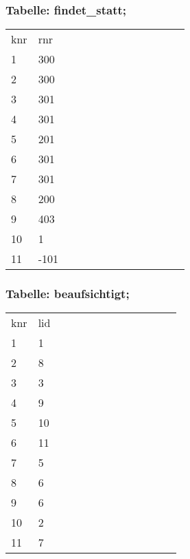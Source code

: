 \documentclass[fleqn]{scrartcl}
\begin{document}
\subsubsection{Tabelle: findet\_statt;}
\begin{tabular}{|l|l|l|l|l|l|l|l|l|l|l|l|l|}\toprule
\rowcolor{green!20}
\multicolumn{2}{|c|}{
findet\_statt;
}\\\midrule
\rowcolor{yellow!30}knr & rnr  \\\midrule
1& 300  \\ 
2& 300  \\ 
3& 301  \\ 
4& 301  \\ 
5& 201  \\ 
6& 301  \\ 
7& 301  \\ 
8& 200  \\ 
9& 403  \\ 
10& 1  \\ 
11& -101  \\ 
\bottomrule
\end{tabular}

\subsubsection{Tabelle: beaufsichtigt;}
\begin{tabular}{|l|l|l|l|l|l|l|l|l|l|l|l|l|}\toprule
\rowcolor{green!20}
\multicolumn{2}{|c|}{
beaufsichtigt;
}\\\midrule
\rowcolor{yellow!30}knr & lid  \\\midrule
1& 1  \\ 
2& 8  \\ 
3& 3  \\ 
4& 9  \\ 
5& 10  \\ 
6& 11  \\ 
7& 5  \\ 
8& 6  \\ 
9& 6  \\ 
10& 2  \\ 
11& 7  \\ 
\bottomrule
\end{tabular}
\end{document}

